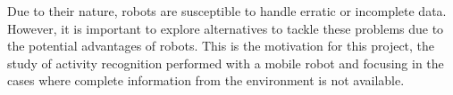 Due to their nature, robots are susceptible to handle erratic or incomplete data. However, it is important to explore alternatives to tackle these problems due to the potential advantages of robots. This is the motivation for this project, the study of activity recognition performed with a mobile robot and focusing in the cases where complete information from the environment is not available.


% 


